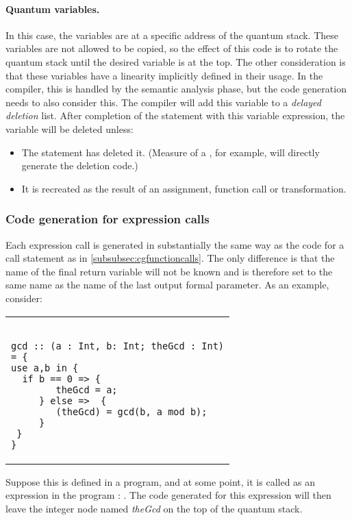 \paragraph{Quantum variables.} In this case, the variables are at a
specific address of the quantum stack. These variables are not allowed
to be copied, so the effect of this code is to rotate the quantum stack 
until the desired variable is at the top. The other consideration
is that these variables have a linearity implicitly defined in their
usage. In the compiler, this is handled by the semantic analysis phase,
but the code generation needs to also consider this. The compiler will
add this variable to a \emph{delayed deletion} list. After completion
of the statement with this variable expression, the variable will be 
deleted unless:
\begin{itemize}
\item{} The statement has deleted it. (Measure of a \qbit, for example, will 
directly generate the deletion code.)
\item{} It is recreated as the result of an assignment, function call or
transformation.
\end{itemize}

\subsubsection{Code generation for expression calls}
Each expression call is generated in substantially the same way 
as the code for
a call statement as in \ref{subsubsec:cgfunctioncalls}. The only 
difference is that the name of the final return variable will not be known
and is therefore set to the same name as the name of the last output formal
parameter. As an example, consider:

\begin{center}
\begin{tabular}{p{4in}}
{\begin{singlespace}
\begin{lstlisting}[style=linqpl]

gcd :: (a : Int, b: Int; theGcd : Int)
= {
use a,b in {
  if b == 0 => { 
        theGcd = a;
     } else =>  { 
        (theGcd) = gcd(b, a mod b);
     }
 }   
}
\end{lstlisting}
\end{singlespace}}
\end{tabular}
\end{center}


Suppose this is defined in a program, and at some point, it is called
as an expression in the program :
. The code generated for this expression will
then leave the integer node named \emph{theGcd} on the top
of the quantum stack.

